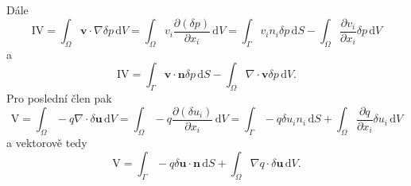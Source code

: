 Dále
\begin{equation*}
\mathrm{IV}
=
\int_{\Omega} 
\mathbf{v} \cdot \nabla \delta p
\, \mathrm{d}V
=
\int_{\Omega} 
v_i \frac{\partial (\delta p) }{\partial x_i}
\, \mathrm{d}V
=
\int_{\Gamma} 
v_i n_i \delta p 
\, \mathrm{d}S
-
\int_{\Omega} 
 \frac{\partial v_i }{\partial x_i} \delta p
\, \mathrm{d}V
\end{equation*}
a 
\begin{equation}\label{eq:clen_IV}
\mathrm{IV}
=
\int_{\Gamma} 
\mathbf{v}\cdot \mathbf{n} \delta p 
\, \mathrm{d}S
-
\int_{\Omega} 
\nabla \cdot \mathbf{v} \delta p
\, \mathrm{d}V.
\end{equation}
Pro poslední člen pak
\begin{equation*}
\mathrm{V}
=
\int_{\Omega} 
- q \nabla \cdot \delta \mathbf{u}
\, \mathrm{d}V
=
\int_{\Omega} 
- q \frac{\partial (\delta u_i)}{\partial x_i}
\, \mathrm{d}V
= 
\int_{\Gamma} 
- q \delta u_i n_i
\, \mathrm{d}S
+
\int_{\Omega} 
 \frac{\partial q}{\partial x_i} \delta u_i
\, \mathrm{d}V
\end{equation*}
a vektorově tedy
\begin{equation}\label{eq:clen_V}
\mathrm{V}
=
\int_{\Gamma} 
- q \delta \mathbf{u \cdot n}
\, \mathrm{d}S
+
\int_{\Omega} 
\nabla q \cdot \delta \mathbf{u}
\, \mathrm{d}V.
\end{equation}

